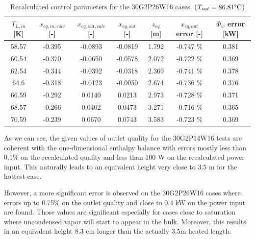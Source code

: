 \begin{table}[!h]
\centering
\begin{tabular}{c|c|c|c|c|c|c}
$T_{L,in}$ {[}K{]} & $x_{eq,in,calc}$ {[}-{]} & $x_{eq,out,calc}$ {[}-{]} & $x_{eq,out}$ {[}-{]} & $z_{eq}$ {[}m{]} & $x_{eq,out}$ error {[}-{]} & $\Phi_{w}$ error {[}kW{]} \\
\hline
\hline
58.57              & -0.395                   & -0.0893                   & -0.0819              & 1.792            & -0.747 \%                  & 0.381                     \\
60.54              & -0.370                   & -0.0650                   & -0.0578              & 2.072            & -0.722 \%                  & 0.369                     \\
62.54              & -0.344                   & -0.0392                   & -0.0318              & 2.369            & -0.741 \%                  & 0.378                     \\
64.6               & -0.318                   & -0.0123                   & -0.0050              & 2.674            & -0.736 \%                  & 0.376                     \\
66.59              & -0.292                   & 0.0140                    & 0.0213               & 2.973            & -0.728 \%                  & 0.371                     \\
68.57              & -0.266                   & 0.0402                    & 0.0473               & 3.271            & -0.716 \%                  & 0.365                     \\
70.59              & -0.239                   & 0.0670                    & 0.0743               & 3.583            & -0.723 \%                  & 0.369                    
\end{tabular}
\caption{Recalculated control parameters for the 30G2P26W16 cases. ($T_{sat} = 86.81\degree\mathrm{C}$)}
\label{tab:xout_30P26_recalc}
\end{table}

As we can see, the given values of outlet quality for the 30G2P14W16 tests are coherent with the one-dimensional enthalpy balance with errors mostly less than 0.1\% on the recalculated quality and less than 100 W on the recalculated power input. This naturally leads to an equivalent height very close to $3.5$ m for the hottest case.


However, a more significant error is observed on the 30G2P26W16 cases where errors up to 0.75\% on the outlet quality and close to 0.4 kW on the power input are found. Those values are significant especially for cases close to saturation where uncondensed vapor will start to appear in the bulk. Moreover, this results in an equivalent height 8.3 cm longer than the actually 3.5m heated length.

